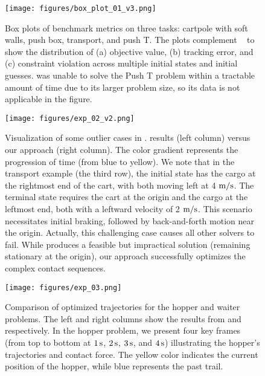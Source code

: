 \begin{figure*}[thp]
    \centering
    \texttt{[image: figures/box\_plot\_01\_v3.png]}
    \caption{Box plots of benchmark metrics on three tasks: cartpole with soft walls, push box, transport, and push T. The plots complement ~ to show the distribution of (a) objective value, (b) tracking error, and (c) constraint violation across multiple initial states and initial guesses.  was unable to solve the Push T problem within a tractable amount of time due to its larger problem size, so its data is not applicable in the figure. }
    \label{fig:box_trackingerror}
\end{figure*}

\begin{figure}[thp]
    \centering
    \texttt{[image: figures/exp\_02\_v2.png]}
    \caption{Visualization of some outlier cases in \ipopt. \ipopt results (left column) versus our approach (right column). The color gradient represents the progression of time (from blue to yellow).
    We note that in the transport example (the third row), the initial state has the cargo at the rightmost end of the cart, with both moving left at 4 $\textup{m}/\textup{s}$. The terminal state requires the cart at the origin and the cargo at the leftmost end, both with a leftward velocity of 2 $\textup{m}/\textup{s}$. This scenario necessitates initial braking, followed by back-and-forth motion near the origin. Actually, this challenging case causes all other solvers to fail. While \ipopt produces a feasible but impractical solution (remaining stationary at the origin), our approach successfully optimizes the complex contact sequences.}
    \label{fig:exp_outlier_01}
\end{figure}

\begin{figure}[thp]
    \centering
    \texttt{[image: figures/exp\_03.png]}
    \caption{Comparison of optimized trajectories for the hopper and waiter problems. The left and right columns show the results from \ipopt and \crisp respectively. In the hopper problem, we present four key frames (from top to bottom at $1\,\textup{s}$, $2\,\textup{s}$, $3\,\textup{s}$, and $4\,\textup{s}$) illustrating the hopper's trajectories and contact force. The yellow color indicates the current position of the hopper, while blue represents the past trail.}
    \label{fig:exp_hopper_waiter}
\end{figure}

